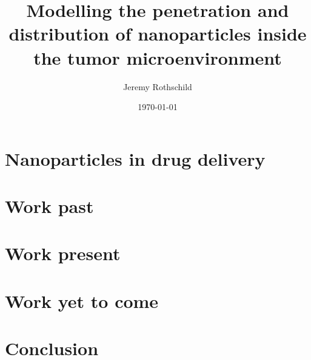 \documentclass[article,superscriptaddress,aps,prd,longbibliography]{revtex4}
\begin{document}
\title{Modelling the penetration and distribution of nanoparticles inside the tumor microenvironment}
\author{Jeremy Rothschild}

\pacs{}
\date{\today}

\maketitle

\section{Nanoparticles in drug delivery}



\section{Work past}



\section{Work present}



\section{Work yet to come} 



\section{Conclusion}




 
\end{document}
